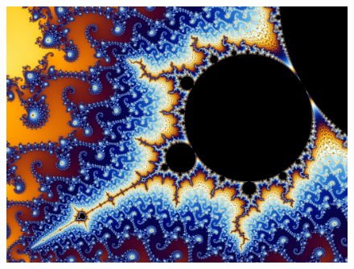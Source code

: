 \documentclass[aspectratio=169]{beamer}
\begin{document}
\begin{frame}[plain]{}
  \begin{figure}
  \vspace*{-4em}
  \hspace*{-4em}
  \includegraphics[width=1.2\linewidth,keepaspectratio]{figures/mandelbrot_2.jpg}
  \end{figure}
\end{frame}
\end{document}
